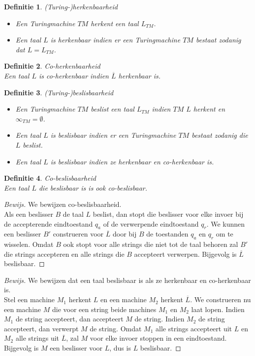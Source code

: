 \documentclass[a4paper]{article}
\newtheorem{tdefinitie}{Definitie}[section]
\newenvironment{definitie}[1]%
  {\begin{mdframed}[backgroundcolor=silver,
    topline=false,
    rightline=false,
    leftline=false,
    bottomline=false]\begin{tdefinitie}#1\\\normalfont}%
  {\end{tdefinitie}\end{mdframed}}
\newenvironment{bewijs}[1]%
  {\begin{mdframed}[topline=true,
    rightline=true,
    leftline=true,
    bottomline=true]\begin{proof}[Bewijs]#1\\[.2cm]\normalfont}%
  {\end{proof}\end{mdframed}}
\begin{document}
\begin{definitie}{(Turing-)herkenbaarheid}
  \vspace{-5mm}\begin{itemize}
  \item Een Turingmachine $TM$ herkent een taal $L_{TM}$.
  \item Een taal $L$ is herkenbaar indien er een Turingmachine $TM$ bestaat zodanig dat $L = L_{TM}$.
  \end{itemize}
\end{definitie}

\begin{definitie}{Co-herkenbaarheid}
  Een taal $L$ is co-herkenbaar indien $\overline{L}$ herkenbaar is.
\end{definitie}

\begin{definitie}{(Turing-)beslisbaarheid}
  \vspace{-5mm}\begin{itemize}
  \item Een Turingmachine $TM$ beslist een taal $L_{TM}$ indien $TM$ $L$ herkent en $\infty_{TM} = \emptyset$.
  \item Een taal $L$ is beslisbaar indien er een Turingmachine $TM$ bestaat zodanig die $L$ beslist.
  \item Een taal $L$ is beslisbaar indien ze herkenbaar en co-herkenbaar is.
  \end{itemize}
\end{definitie}

\begin{definitie}{Co-beslisbaarheid}
  Een taal $L$ die beslisbaar is is ook co-beslisbaar.
\end{definitie}

\begin{bewijs}{We bewijzen co-beslisbaarheid.}
  Als een beslisser $B$ de taal $L$ beslist, dan stopt die beslisser voor elke invoer bij de accepterende eindtoestand $q_a$ of de verwerpende eindtoestand $q_r$. We kunnen een beslisser $B'$ construeren voor $\overline{L}$ door bij $B$ de toestanden $q_a$ en $q_r$ om te wisselen. Omdat $B$ ook stopt voor alle strings die niet tot de taal behoren zal $B'$ die strings accepteren en alle strings die $B$ accepteert verwerpen. Bijgevolg is $\overline{L}$ beslisbaar.
\end{bewijs}

\begin{bewijs}{We bewijzen dat een taal beslisbaar is als ze herkenbaar en co-herkenbaar is.}
  Stel een machine $M_1$ herkent $L$ en een machine $M_2$ herkent $\overline{L}$. We construeren nu een machine $M$ die voor een string beide machines $M_1$ en $M_2$ laat lopen. Indien $M_1$ de string accepteert, dan accepteert $M$ de string. Indien $M_2$ de string accepteert, dan verwerpt $M$ de string. Omdat $M_1$ alle strings accepteert uit $L$ en $M_2$ alle strings uit $\overline{L}$, zal $M$ voor elke invoer stoppen in een eindtoestand. Bijgevolg is $M$ een beslisser voor $L$, dus is $L$ beslisbaar.
\end{bewijs}
\end{document}
